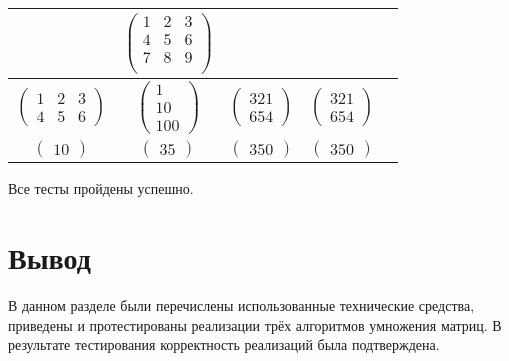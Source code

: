 \begin{table}[ht]
\begin{center}
\begin{threeparttable}
\begin{tabular}{|c|c|c|c|c|}
				&
				$\begin{pmatrix}
					1 & 2 & 3\\
					4 & 5 & 6 \\
					7 & 8 & 9 \\
				\end{pmatrix}$ \\ 
				\hline
				$\begin{pmatrix}
					1 & 2 & 3 \\
					4 & 5 & 6
				\end{pmatrix}$
				&
				$\begin{pmatrix}
					1 \\
					10 \\
					100
				\end{pmatrix}$
				&
				$\begin{pmatrix}
					321 \\
					654
				\end{pmatrix}$ 
				&
				$\begin{pmatrix}
					321 \\
					654
				\end{pmatrix}$ \\ 
				\hline
				$\begin{pmatrix}
					10
				\end{pmatrix}$
				&
				$\begin{pmatrix}
					35
				\end{pmatrix}$
				&
				$\begin{pmatrix}
					350
				\end{pmatrix}$ 
				&
				$\begin{pmatrix}
					350
				\end{pmatrix}$ \\ 
				\hline
			\end{tabular}
		\end{threeparttable}
	\end{center}
\end{table}

Все тесты пройдены успешно.

\section*{Вывод}

В данном разделе были перечислены использованные технические средства, приведены и протестированы реализации трёх алгоритмов умножения матриц. В результате тестирования корректность реализаций была подтверждена.

\clearpage

